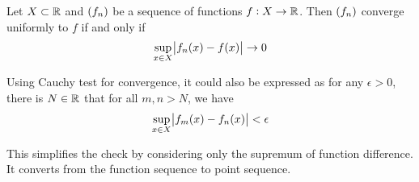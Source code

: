 \begin{theorem}
    Let $X \subset \mathbb{R}$ and $\sequence{f_n}$ be a sequence of functions $f: X \rightarrow \mathbb{R}$. Then $\sequence{f_n}$ converge uniformly to $f$ if and only if 
    \begin{equation}
        \sup_{x \in X} \abs{f_n(x) - f(x)} \rightarrow 0
    \end{equation}
    
    Using Cauchy test for convergence, it could also be expressed as for any $\epsilon > 0$, there is $N \in \mathbb{R}$ that for all $m,n>N$, we have
    \begin{equation}
        \sup_{x \in X} \abs{f_m(x) - f_n(x)} < \epsilon
    \end{equation}
    
    This simplifies the check by considering only the supremum of function difference. It converts from the function sequence to point sequence.
\end{theorem}
  







































































